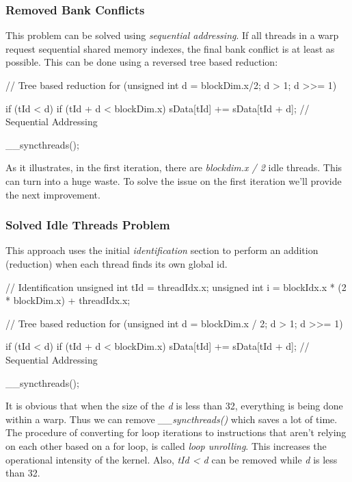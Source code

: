 \documentclass[12pt]{article}
\numberwithin{equation}{section}
\numberwithin{table}{section}
\numberwithin{figure}{section}
\begin{document}
\subsubsection*{Removed Bank Conflicts}
This problem can be solved using \textit{sequential addressing}. If all threads in a warp request sequential shared memory indexes, the final bank conflict is at least as possible. This can be done using a reversed tree based reduction:
\begin{cpp}
	// Tree based reduction
	for (unsigned int d = blockDim.x/2; d > 1; d >>= 1) {
		if (tId < d)
			if (tId + d < blockDim.x)
				sData[tId] += sData[tId + d];		// Sequential Addressing
		
		__syncthreads();
	}
\end{cpp}
As it illustrates, in the first iteration, there are \textit{blockdim.x / 2} idle threads. This can turn into a huge waste. To solve the issue on the first iteration we'll provide the next improvement.
\subsubsection*{Solved Idle Threads Problem}
This approach uses the initial \textit{identification} section to perform an addition (reduction) when each thread finds its own global id.
\begin{cpp}
	// Identification
	unsigned int tId = threadIdx.x;
	unsigned int i = blockIdx.x * (2 * blockDim.x) + threadIdx.x;
	
	// Tree based reduction
	for (unsigned int d = blockDim.x / 2; d > 1; d >>= 1) {
		if (tId < d)
			if (tId + d < blockDim.x)
				sData[tId] += sData[tId + d];		// Sequential Addressing
		
		__syncthreads();
	}
\end{cpp}
It is obvious that when the size of the \textit{d} is less than 32, everything is being done within a warp. Thus we can remove \textit{\_\_syncthreads()} which saves a lot of time. The procedure of converting for loop iterations to instructions that aren't relying on each other based on a for loop, is called \textit{loop unrolling}. This increases the operational intensity of the kernel. Also, \textit{tId < d} can be removed while \textit{d} is less than 32.
\end{document}

